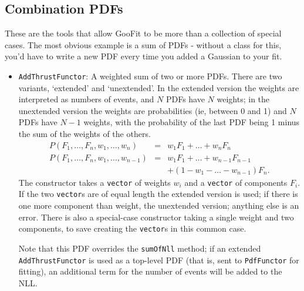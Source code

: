 \documentclass[12pt,pdflatex]{article}
\begin{document}
\subsection{Combination PDFs}

These are the tools that allow GooFit to be more than a collection
of special cases. The most obvious example is a sum of PDFs - without
a class for this, you'd have to write a new PDF every time you added a Gaussian
to your fit. 

\begin{itemize}
\item \texttt{AddThrustFunctor}: A weighted sum of two or more PDFs. There are two variants,
`extended' and `unextended'. In the extended version the weights are interpreted as numbers
of events, and $N$ PDFs have $N$ weights; in the unextended version the weights are probabilities
(ie, between 0 and 1) and $N$ PDFs have $N-1$ weights, with the probability of the last PDF
being 1 minus the sum of the weights of the others. 
\begin{eqnarray}
P(F_1,\ldots, F_n,w_1,\ldots,w_n) &=& w_1F_1 + \ldots + w_nF_n \\
P(F_1,\ldots, F_n,w_1,\ldots,w_{n-1}) &=& 
w_1F_1 + \ldots + w_{n-1}F_{n-1}\\
&&+ (1 - w_1 - \ldots - w_{n-1})F_n.
\end{eqnarray}
The constructor takes a \texttt{vector} of weights $w_i$ and a \texttt{vector}
of components $F_i$. If the two \texttt{vector}s are of equal length the extended
version is used; if there is one more component than weight, the unextended version;
anything else is an error. There is also a special-case constructor taking a single
weight and two components, to save creating the \texttt{vector}s in this common case.

Note that this PDF overrides the \texttt{sumOfNll} method; if an extended \texttt{AddThrustFunctor}
is used as a top-level PDF (that is, sent to \texttt{PdfFunctor} for fitting), an additional
term for the number of events will be added to the NLL.


\end{itemize}
\end{document}

